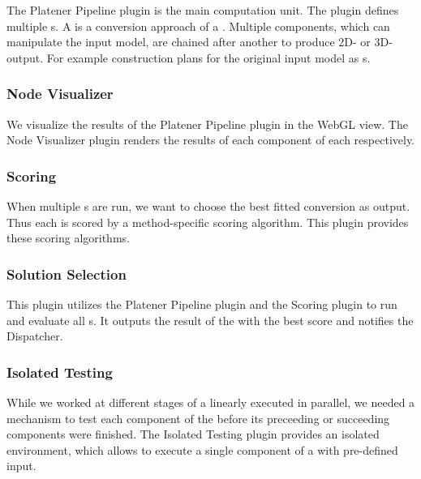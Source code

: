 \documentclass[../ClassicThesis.tex]{subfiles}
\begin{document}
The Platener Pipeline plugin is the main computation unit. The plugin defines
multiple {\fabmethod}s. A {\fabmethod} is a conversion approach of a
\threedmodel. Multiple components, which can manipulate the input model, are
chained after another to produce 2D- or 3D-output. For example construction
plans for the original input model as {\svgfile}s.

\subsubsection{Node Visualizer}

We visualize the results of the Platener Pipeline plugin in the WebGL view. The
Node Visualizer plugin renders the results of each component of each
{\fabmethod} respectively.


\subsubsection{Scoring}

When multiple {\fabmethod}s are run, we want to choose the best fitted
conversion as output. Thus each {\fabmethod} is scored by a method-specific
scoring algorithm. This plugin provides these scoring algorithms.

\subsubsection{Solution Selection}

This plugin utilizes the Platener Pipeline plugin and the Scoring plugin to run
and evaluate all {\fabmethod}s. It outputs the result of the {\fabmethod} with
the best score and notifies the Dispatcher.

\subsubsection{Isolated Testing}

While we worked at different stages of a linearly executed {\fabmethod} in
parallel, we needed a mechanism to test each component of the {\fabmethod}
before its preceeding or succeeding components were finished. The Isolated
Testing plugin provides an isolated environment, which allows to execute a
single component of a {\fabmethod} with pre-defined input.

\end{document}
